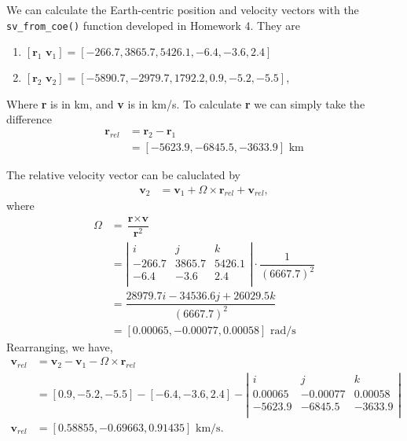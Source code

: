 \documentclass[onecolumn,10pt]{jhwhw}
\begin{document}
We can calculate the Earth-centric position and velocity vectors with the \verb|sv_from_coe()| function developed in Homework 4. They are
\begin{enumerate}
\itemsep0em
\item $[\textbf{r}_1 \textbf{ v}_1] = [-266.7,  3865.7,  5426.1, -6.4 , -3.6,  2.4]$
\item $[\textbf{r}_2 \textbf{ v}_2] = [-5890.7, -2979.7,  1792.2, 0.9, -5.2, -5.5]$,
\end{enumerate}
Where \textbf{r} is in km, and \textbf{v} is in km/s. To calculate \textbf{r} we can simply take the difference
\begin{align*}
   \textbf{r}_{rel} &= \textbf{r}_2 - \textbf{r}_1 \\
                    &= [-5623.9, -6845.5, -3633.9] \mbox{ km}
\end{align*}

The relative velocity vector can be caluclated by
\begin{align*}
\textbf{v}_{2} &= \textbf{v}_1 + \textbf{$\Omega$} \times \textbf{r}_{rel} + \textbf{v}_{rel},
\end{align*}
where
\begin{align*}
\textbf{$\Omega$} &= \dfrac{\textbf{r} \times \textbf{v}}{\textbf{r}^2} \\
 &= \left|
 \begin{array}{ccc}
 i & j & k \\
 -266.7 & 3865.7 & 5426.1 \\
 -6.4 & -3.6 &  2.4 \\
 \end{array}
 \right| \cdot \dfrac{1}{(6667.7)^2} \\
 &= \dfrac{28979.7i -34536.6j + 26029.5k}{(6667.7)^2} \\
 &= [ 0.00065, -0.00077,  0.00058] \mbox{ rad/s}
\end{align*}
Rearranging, we have,
\begin{align*}
\textbf{v}_{rel} &= \textbf{v}_{2} - \textbf{v}_1 - \textbf{$\Omega$} \times \textbf{r}_{rel} \\
\phantom{\textbf{v}_{rel}} &= [0.9, -5.2, -5.5] - [-6.4, -3.6, 2.4] - \left|
 \begin{array}{ccc}
 i & j & k \\
 0.00065 & -0.00077 & 0.00058 \\
 -5623.9 &  -6845.5 & -3633.9 \\
 \end{array}
 \right| \\
\textbf{v}_{rel} &= [0.58855, -0.69663,  0.91435] \mbox{ km/s}.
\end{align*}
\end{document}
